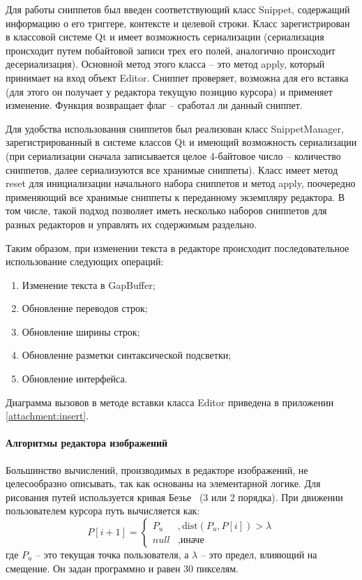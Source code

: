 \documentclass[explnote]{espd}
\begin{document}
Для работы сниппетов был введен соответствующий класс Snippet, содержащий информацию о его триггере, контексте и целевой строки. Класс зарегистрирован в классовой системе Qt и имеет возможность сериализации (сериализация происходит путем побайтовой записи трех его полей, аналогично происходит десериализация). Основной метод этого класса -- это метод apply, который принимает на вход объект Editor. Сниппет проверяет, возможна для его вставка (для этого он получает у редактора текущую позицию курсора) и применяет изменение. Функция возвращает флаг -- сработал ли данный сниппет.

Для удобства использования сниппетов был реализован класс SnippetManager, зарегистрированный в системе классов Qt и имеющий возможность сериализации (при сериализации сначала записывается целое 4-байтовое число -- количество сниппетов, далее сериализуются все хранимые сниппеты). Класс имеет метод reset для инициализации начального набора сниппетов и метод apply, поочередно применяющий все хранимые сниппеты к переданному экземпляру редактора. В том числе, такой подход позволяет иметь несколько наборов сниппетов для разных редакторов и управлять их содержимым раздельно.

Таким образом, при изменении текста в редакторе происходит последовательное использование следующих операций:

\begin{enumerate}
\item Изменение текста в GapBuffer;
\item Обновление переводов строк;
\item Обновление ширины строк;
\item Обновление разметки синтаксической подсветки;
\item Обновление интерфейса.
\end{enumerate}

Диаграмма вызовов в методе вставки класса Editor приведена в приложении \ref{attachment:insert}.

\paragraph{Алгоритмы редактора изображений}
Большинство вычислений, производимых в редакторе изображений, не целесообразно описывать, так как основаны на элементарной логике. Для рисования путей используется кривая Безье~\cite{bezie} (3 или 2 порядка). При движении пользователем курсора путь вычисляется как:
\begin{equation}
P[i + 1] = \begin{cases}P_u &, \text{dist}(P_u, P[i]) > \lambda \\ null &, \text{иначе}\end{cases}
\end{equation}
где $P_u$ -- это текущая точка пользователя, а $\lambda$ -- это предел, влияющий на смещение. Он задан программно и равен 30 пикселям.
\end{document}
